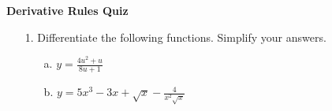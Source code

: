 \documentclass[11pt]{article}
\begin{document}

\centerline{\textbf{\Large{Derivative Rules Quiz}}}

\vspace{0.2in}
 

\begin{enumerate}

\item[1.] Differentiate the following functions. Simplify your answers.
\begin{enumerate}
	\item[a.] $y = \frac{4u^2 + u}{8u + 1}$ 
	\vspace{12cm}
	\item[b.] $ y = 5 x^3 - 3 x + \sqrt{x} - \frac{4}{x^2 \sqrt{x}}$
\end{enumerate}  
	
\end{enumerate}
 
\end{document}
